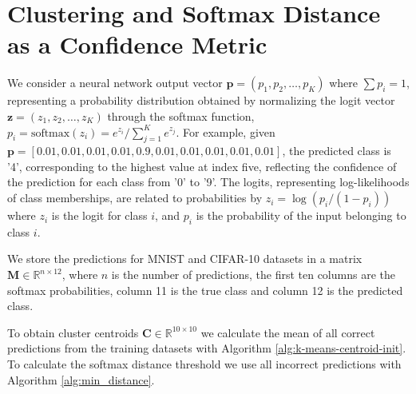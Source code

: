 
\section{Clustering and Softmax Distance as a Confidence Metric}


We consider a neural network output vector $\mathbf{p} = (p_1, p_2, \dots, p_K)$ where $\sum p_i = 1$, representing a probability distribution obtained by normalizing the logit vector $\mathbf{z} = (z_1, z_2, \dots, z_K)$ through the softmax function, $p_i = \text{softmax}(z_i) = e^{z_i} / \sum_{j=1}^{K} e^{z_j}$. For example, given $\mathbf{p} = [0.01, 0.01, 0.01, 0.01, 0.9, 0.01, 0.01, 0.01, 0.01, 0.01]$, the predicted class is '4', corresponding to the highest value at index five, reflecting the confidence of the prediction for each class from '0' to '9'. The logits, representing log-likelihoods of class memberships, are related to probabilities by $z_i = \log (p_i / (1 - p_i))$ where $z_i$ is the logit for class $i$, and $p_i$ is the probability of the input belonging to class $i$\cite{goodfellow2016deep, bishop2006pattern}.

We store the predictions for MNIST and CIFAR-10 datasets in a matrix $\mathbf{M} \in \mathbb{R}^{n \times 12}$, where $n$ is the number of predictions, the first ten columns are the softmax probabilities, column 11 is the true class and column 12 is the predicted class.

To obtain cluster centroids $\mathbf{C} \in \mathbb{R}^{10 \times 10}$ we calculate the mean of all correct predictions from the training datasets with Algorithm \ref{alg:k-means-centroid-init}. To calculate the softmax distance threshold we use all incorrect predictions with Algorithm \ref{alg:min_distance}.

